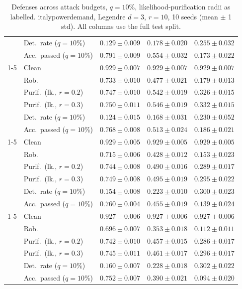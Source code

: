 \begin{table}[htbp]
\begin{tabular}{@{}llrrr@{}}
     & Det.\ rate ($q{=}10\%$) & $0.129 \pm 0.009$ & $0.178 \pm 0.020$ & $0.255 \pm 0.032$ \\
     & Acc.\ passed ($q{=}10\%$) & $0.791 \pm 0.009$ & $0.554 \pm 0.032$ & $0.173 \pm 0.022$ \\
    \cmidrule(lr){1-5}
    \multirow{6}{*}{$\alpha{=}0.2$} & Clean & $0.929 \pm 0.007$ & $0.929 \pm 0.007$ & $0.929 \pm 0.007$ \\
     & Rob. & $0.733 \pm 0.010$ & $0.477 \pm 0.021$ & $0.179 \pm 0.013$ \\
     & Purif.\ (lk., $r{=}0.2$) & $0.747 \pm 0.010$ & $0.542 \pm 0.019$ & $0.326 \pm 0.015$ \\
     & Purif.\ (lk., $r{=}0.3$) & $0.750 \pm 0.011$ & $0.546 \pm 0.019$ & $0.332 \pm 0.015$ \\
     & Det.\ rate ($q{=}10\%$) & $0.124 \pm 0.015$ & $0.168 \pm 0.031$ & $0.230 \pm 0.052$ \\
     & Acc.\ passed ($q{=}10\%$) & $0.768 \pm 0.008$ & $0.513 \pm 0.024$ & $0.186 \pm 0.021$ \\
    \cmidrule(lr){1-5}
    \multirow{6}{*}{$\alpha{=}0.5$} & Clean & $0.929 \pm 0.005$ & $0.929 \pm 0.005$ & $0.929 \pm 0.005$ \\
     & Rob. & $0.715 \pm 0.006$ & $0.428 \pm 0.012$ & $0.153 \pm 0.023$ \\
     & Purif.\ (lk., $r{=}0.2$) & $0.744 \pm 0.008$ & $0.490 \pm 0.016$ & $0.289 \pm 0.017$ \\
     & Purif.\ (lk., $r{=}0.3$) & $0.749 \pm 0.008$ & $0.495 \pm 0.019$ & $0.295 \pm 0.022$ \\
     & Det.\ rate ($q{=}10\%$) & $0.154 \pm 0.008$ & $0.223 \pm 0.010$ & $0.300 \pm 0.023$ \\
     & Acc.\ passed ($q{=}10\%$) & $0.760 \pm 0.004$ & $0.455 \pm 0.019$ & $0.139 \pm 0.024$ \\
    \cmidrule(lr){1-5}
    \multirow{6}{*}{$\alpha{=}1$} & Clean & $0.927 \pm 0.006$ & $0.927 \pm 0.006$ & $0.927 \pm 0.006$ \\
     & Rob. & $0.696 \pm 0.007$ & $0.353 \pm 0.018$ & $0.112 \pm 0.011$ \\
     & Purif.\ (lk., $r{=}0.2$) & $0.742 \pm 0.010$ & $0.457 \pm 0.015$ & $0.286 \pm 0.017$ \\
     & Purif.\ (lk., $r{=}0.3$) & $0.745 \pm 0.011$ & $0.461 \pm 0.017$ & $0.296 \pm 0.017$ \\
     & Det.\ rate ($q{=}10\%$) & $\mathbf{0.160 \pm 0.007}$ & $\mathbf{0.228 \pm 0.018}$ & $\mathbf{0.302 \pm 0.022}$ \\
     & Acc.\ passed ($q{=}10\%$) & $0.752 \pm 0.007$ & $0.390 \pm 0.021$ & $0.094 \pm 0.020$ \\
    \bottomrule
  \end{tabular}
  \caption{Defenses across attack budgets, $q{=}10\%$, likelihood-purification radii as labelled. italypowerdemand, Legendre $d{=}3$, $r{=}10$, 10 seeds (mean $\pm$ 1 std). All columns use the full test split.}
  \label{tab:italypowerdemand_models_r10}
\end{table}
